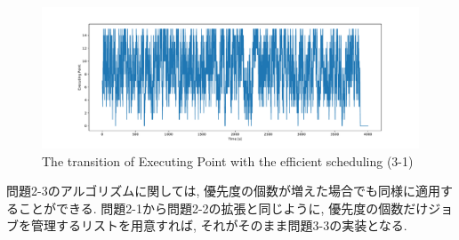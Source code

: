 \begin{figure}[htbp]
  \centering
  \includegraphics[width=\linewidth]{imgs/log3_1.pdf}
  \caption{The transition of Executing Point with the efficient scheduling (3-1)}
  \label{fig:log3-1}
\end{figure}

問題2-3のアルゴリズムに関しては, 優先度の個数が増えた場合でも同様に適用することができる.
問題2-1から問題2-2の拡張と同じように, 優先度の個数だけジョブを管理するリストを用意すれば, それがそのまま問題3-3の実装となる.


